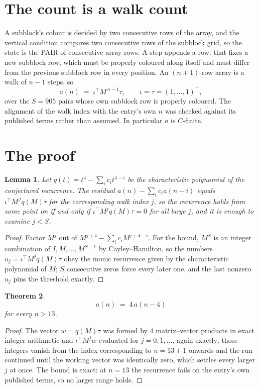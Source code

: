 \documentclass[11pt,a4paper]{article}
\theoremstyle{plain}
\newtheorem{theorem}{Theorem}
\newtheorem{lemma}[theorem]{Lemma}
\theoremstyle{definition}
\begin{document}
\section{The count is a walk count}

A subblock's colour is decided by two consecutive rows of the array, and
the vertical condition compares two consecutive rows of the subblock grid, so the state is the
PAIR of consecutive array rows. A step appends a row: that fixes a new subblock row, which
must be properly coloured along itself and must differ from the previous subblock row in every
position. An $(n+1)$-row array is a walk of $n-1$ steps, so
\[
a(n)\;=\;\iota^{\!\top}M^{\,n-1}\tau,\qquad\iota=\tau=(1,\dots,1)^{\!\top},
\]
over the $S=905$ pairs whose own subblock row is properly coloured.
The alignment of the walk index with the entry's own $n$ was checked against its published
terms rather than assumed. In particular $a$ is $C$-finite.

\section{The proof}

\begin{lemma}\label{lem:crit}
Let $q(t)=t^{4}-\sum_i c_it^{4-i}$ be the characteristic polynomial of the
conjectured recurrence. The residual $a(n)-\sum_ic_ia(n-i)$ equals
$\iota^{\!\top}M^{\,j}q(M)\tau$ for the corresponding walk index $j$, so the recurrence
holds from some point on if and only if $\iota^{\!\top}M^{j}q(M)\tau=0$ for all large $j$,
and it is enough to examine $j<S$.
\end{lemma}

\begin{proof}
Factor $M^{j}$ out of $M^{j+4}-\sum_ic_iM^{j+4-i}$. For the bound, $M^{S}$
is an integer combination of $I,M,\dots,M^{S-1}$ by Cayley--Hamilton, so the numbers
$u_j=\iota^{\!\top}M^{j}q(M)\tau$ obey the monic recurrence given by the characteristic
polynomial of $M$; $S$ consecutive zeros force every later one, and the last nonzero $u_j$
pins the threshold exactly.
\end{proof}

\begin{theorem}
\[
a(n)\;=\;4\,a(n-4)
\]
for every $n>13$.
\end{theorem}

\begin{proof}
The vector $w=q(M)\tau$ was formed by $4$ matrix--vector products in exact integer
arithmetic and $\iota^{\!\top}M^{j}w$ evaluated for $j=0,1,\dots$, again exactly; those
integers vanish from the index corresponding to $n=13+1$ onwards and the run continued
until the working vector was identically zero, which settles every larger $j$ at once. The bound is exact: at $n=13$ the recurrence fails on the entry's own published terms, so no larger range holds.
\end{proof}
\end{document}
